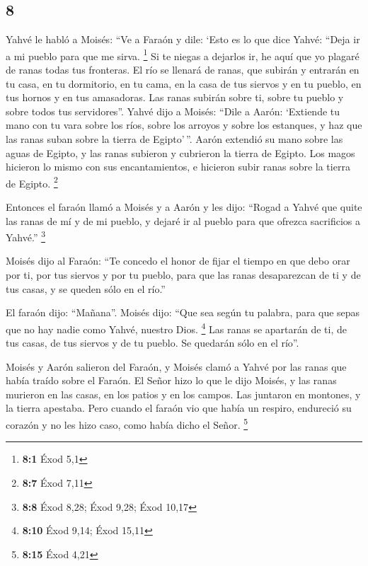 \begin{paracol}{2}
\hypertarget{section-14}{%
\section{8}\label{section-14}}

 Yahvé le habló a Moisés: ``Ve a Faraón y dile: `Esto es
lo que dice Yahvé: ``Deja ir a mi pueblo para que me sirva. \footnote{\textbf{8:1}
  Éxod 5,1}  Si te niegas a dejarlos ir, he aquí que yo
plagaré de ranas todas tus fronteras.  El río se llenará
de ranas, que subirán y entrarán en tu casa, en tu dormitorio, en tu
cama, en la casa de tus siervos y en tu pueblo, en tus hornos y en tus
amasadoras.  Las ranas subirán sobre ti, sobre tu pueblo y
sobre todos tus servidores''.  Yahvé dijo a Moisés: ``Dile
a Aarón: `Extiende tu mano con tu vara sobre los ríos, sobre los arroyos
y sobre los estanques, y haz que las ranas suban sobre la tierra de
Egipto'\,''.  Aarón extendió su mano sobre las aguas de
Egipto, y las ranas subieron y cubrieron la tierra de Egipto.
 Los magos hicieron lo mismo con sus encantamientos, e
hicieron subir ranas sobre la tierra de Egipto. \footnote{\textbf{8:7}
  Éxod 7,11}

 Entonces el faraón llamó a Moisés y a Aarón y les dijo:
``Rogad a Yahvé que quite las ranas de mí y de mi pueblo, y dejaré ir al
pueblo para que ofrezca sacrificios a Yahvé.'' \footnote{\textbf{8:8}
  Éxod 8,28; Éxod 9,28; Éxod 10,17}

 Moisés dijo al Faraón: ``Te concedo el honor de fijar el
tiempo en que debo orar por ti, por tus siervos y por tu pueblo, para
que las ranas desaparezcan de ti y de tus casas, y se queden sólo en el
río.''

 El faraón dijo: ``Mañana''. Moisés dijo: ``Que sea según
tu palabra, para que sepas que no hay nadie como Yahvé, nuestro Dios.
\footnote{\textbf{8:10} Éxod 9,14; Éxod 15,11}  Las ranas
se apartarán de ti, de tus casas, de tus siervos y de tu pueblo. Se
quedarán sólo en el río''.

 Moisés y Aarón salieron del Faraón, y Moisés clamó a
Yahvé por las ranas que había traído sobre el Faraón.  El
Señor hizo lo que le dijo Moisés, y las ranas murieron en las casas, en
los patios y en los campos.  Las juntaron en montones, y
la tierra apestaba.  Pero cuando el faraón vio que había
un respiro, endureció su corazón y no les hizo caso, como había dicho el
Señor. \footnote{\textbf{8:15} Éxod 4,21}


\end{paracol}
